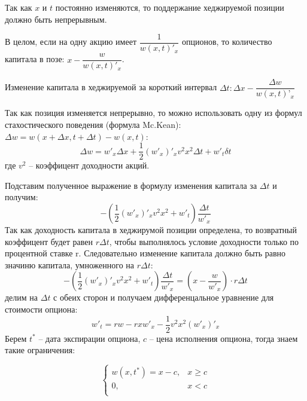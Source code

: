 \documentclass[a4paper]{article}
\begin{document}
Так как $x$ и $t$ постоянно изменяются, то поддержание хеджируемой позиции должно быть непрерывным.


В целом, если на одну акцию имеет $\dfrac{1}{w(x, t)'_x}$ опционов, то количество капитала в позе: $x - \dfrac{w}{w(x, t)'_x}$.

Изменение капитала в хеджируемой за короткий интервал $\Delta t: \Delta x - \dfrac{\Delta w}{w(x, t)’_x}$

Так как позиция изменяется непрерывно, то можно использовать одну из формул стахостического поведения (формула Mc.Kean): $\Delta w = w(x + \Delta x, t + \Delta t) - w(x, t)$:
\[\Delta w = w'_x \Delta x + \frac{1}{2} (w'_x)'_x v^2 x^2 \Delta t + w'_t \delta t\]
где $v^2$ -- коэффицент доходности акций.

Подставим полученное выражение в формулу изменения капитала за $\Delta t$ и получим:
\[- \left(\dfrac{1}{2} (w'_x)'_x v^2 x^2 + w'_t \right) \dfrac{\Delta t}{w'_x}\]
Так как доходность капитала в хеджирумой позиции определена, то возвратный коэффицент будет равен $r \Delta t$, чтобы выполнялось условие доходности только по процентной ставке r. Следовательно изменение капитала должно быть равно значиню капитала, умноженного на $r \Delta t$:
\[- \left(\dfrac{1}{2} (w'_x)'_x v^2 x^2 + w'_t \right) \dfrac{\Delta t}{w'_x} = (x - \dfrac{w}{w'_x}) \cdot r \Delta t\]
делим на $\Delta t $ с обеих сторон и получаем дифференцальное уравнение для стоимости опциона:
\[w'_t = rw - rxw'_x - \dfrac{1}{2} v^2 x^2 (w'_x)'_x\]
Берем $t^*$ -- дата экспирации опциона, $c$ -- цена исполнения опциона, тогда знаем такие ограничения:

\begin{equation*}
    \begin{cases}
        w(x, t^*) = x - c, &x \geq c\\
        0, &x < c \\
    \end{cases}
\end{equation*}
\end{document}
